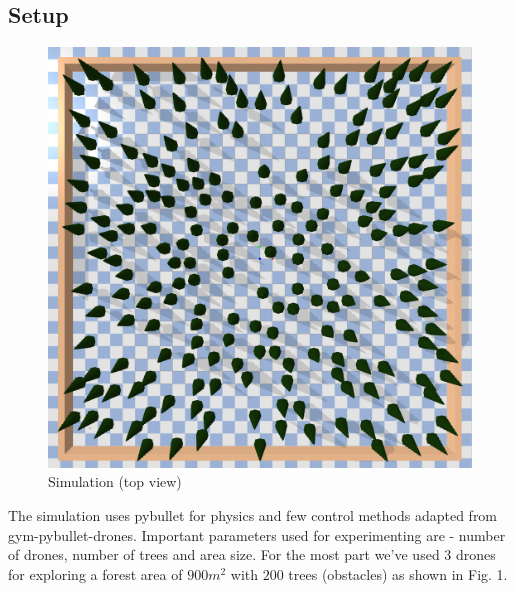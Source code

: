 \subsection{Setup}

\begin{figure}[h]
\centering
\includegraphics[scale=0.19]{images/SimulationImage.png}
\caption{Simulation (top view)}
\end{figure}


The simulation uses pybullet for physics and few control methods adapted from gym-pybullet-drones. Important parameters used for experimenting are - number of drones, number of trees and area size. For the most part we've used $3$ drones for exploring a forest area of $900m^2$ with $200$ trees (obstacles) as shown in Fig. 1. \\

